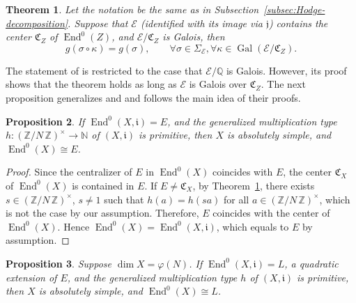 \documentclass{amsart}[11pt]
\newtheorem{thm}{Theorem}[section]
\newtheorem{prop}[thm]{Proposition}
\theoremstyle{definition}
\numberwithin{equation}{section}
\theoremstyle{notitle}
\begin{document}
\begin{thm} \label{thm:Zarhin_multiplication_type} Let the notation be
  the same as in Subsection~\ref{subsec:Hodge-decomposition}.  Suppose
  that ${\mathcal{E}}$ (identified with its image via ${\mathfrak{j}}$) contains the center
  ${\mathfrak{C}}_Z$ of $\operatorname{End}^0(Z)$, and ${\mathcal{E}}/{\mathfrak{C}}_Z$ is Galois, then
\[ g(\sigma \circ \kappa)=
  g(\sigma), \qquad  \forall \sigma\in \Sigma_{\mathcal{E}}, \forall \kappa \in \operatorname{Gal}({\mathcal{E}}/{\mathfrak{C}}_Z). \]
\end{thm}
The statement of \cite[Theorem 2.3]{MR2040573} is restricted to the
case that ${\mathcal{E}}/{\mathbb{Q}}$ is Galois. However, its proof shows that the
theorem holds as long as ${\mathcal{E}}$ is Galois over ${\mathfrak{C}}_Z$.  The next
proposition generalizes \cite[Theorem 4.2]{MR2349666} and
\cite[Corollary 2.2]{MR2166091} and follows the main idea of their
proofs. 

\begin{prop}\label{prop:centeralizer-is-E}
  If $\operatorname{End}^0(X, {\mathfrak{i}})=E$, and the generalized multiplication type $h:
  {(\mathbb{Z}/ {N}\, \mathbb{Z})^\times}\to {\mathbb{N}}$ of $(X, {\mathfrak{i}})$ is primitive, then $X$ is absolutely
  simple, and $\operatorname{End}^0(X)\cong E$.
\end{prop}

\begin{proof}
  Since the centralizer of $E$ in $\operatorname{End}^0(X)$ coincides with $E$, the
  center ${\mathfrak{C}}_X$ of $\operatorname{End}^0(X)$ is contained in $E$. If $E\neq {\mathfrak{C}}_X$,
  by Theorem~\ref{thm:Zarhin_multiplication_type}, there exists $s\in
  {(\mathbb{Z}/ {N}\, \mathbb{Z})^\times}$, $s\neq 1$ such that $h(a)= h(sa)$ for all $a\in
  {(\mathbb{Z}/ {N}\, \mathbb{Z})^\times}$, which is not the case by our assumption.  Therefore, $E$
  coincides with the center of $\operatorname{End}^0(X)$. Hence
  $\operatorname{End}^0(X)= \operatorname{End}^0(X, {\mathfrak{i}})$, which equals to $E$ by assumption.
\end{proof}

\begin{prop}\label{prop:centralizer-is-quadratic-extension}
  Suppose $\dim X=\varphi(N)$. If $\operatorname{End}^0(X, {\mathfrak{i}})=L$, a quadratic
  extension of $E$, and the generalized multiplication type $h$ of
  $(X, {\mathfrak{i}})$ is primitive, then $X$ is absolutely simple, and
  $\operatorname{End}^0(X)\cong L$.
\end{prop}
\end{document}
